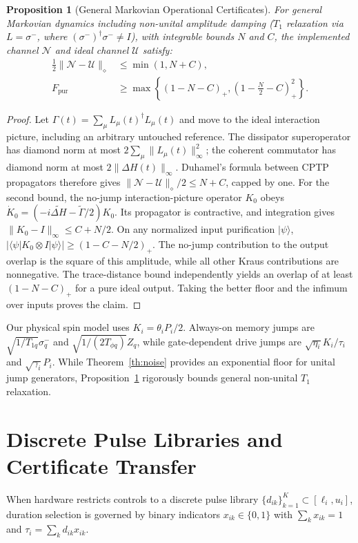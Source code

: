 \documentclass[10pt,letterpaper,journal]{IEEEtran}
\newtheorem{proposition}{Proposition}
\begin{document}
\begin{proposition}[General Markovian Operational Certificates]\label{prop:nonunitary}
For general Markovian dynamics including non-unital amplitude damping ($T_1$ relaxation via $L = \sigma^-$, where $(\sigma^-)^\dagger \sigma^- \ne I$), with integrable bounds $N$ and $C$, the implemented channel $\mathcal{N}$ and ideal channel $\mathcal{U}$ satisfy:
\begin{align}
\tfrac{1}{2}\|\mathcal{N} - \mathcal{U}\|_\diamond &\le \min(1, N + C),\\
F_{\mathrm{pur}} &\ge \max\left\{ (1 - N - C)_+, \left(1 - \tfrac{N}{2} - C\right)_+^2 \right\}.
\end{align}
\end{proposition}
\begin{proof}
Let $\Gamma(t)=\sum_\mu L_\mu(t)^\dagger L_\mu(t)$ and move to the ideal interaction picture, including an arbitrary untouched reference. The dissipator superoperator has diamond norm at most $2\sum_\mu\|L_\mu(t)\|_\infty^2$; the coherent commutator has diamond norm at most $2\|\Delta H(t)\|_\infty$. Duhamel's formula between CPTP propagators therefore gives $\|\mathcal N-\mathcal U\|_\diamond/2\le N+C$, capped by one. For the second bound, the no-jump interaction-picture operator $K_0$ obeys $\dot K_0=(-i\widetilde{\Delta H}-\widetilde\Gamma/2)K_0$. Its propagator is contractive, and integration gives $\|K_0-I\|_\infty\le C+N/2$. On any normalized input purification $|\psi\rangle$, $|\langle\psi|K_0\otimes I|\psi\rangle|\ge(1-C-N/2)_+$. The no-jump contribution to the output overlap is the square of this amplitude, while all other Kraus contributions are nonnegative. The trace-distance bound independently yields an overlap of at least $(1-N-C)_+$ for a pure ideal output. Taking the better floor and the infimum over inputs proves the claim.
\end{proof}

Our physical spin model uses $K_i = \theta_i P_i/2$. Always-on memory jumps are $\sqrt{1/T_{1q}}\sigma^-_q$ and $\sqrt{1/(2T_{\phi q})}Z_q$, while gate-dependent drive jumps are $\sqrt{\eta_i}K_i/\tau_i$ and $\sqrt{\gamma_i}P_i$. While Theorem~\ref{th:noise} provides an exponential floor for unital jump generators, Proposition~\ref{prop:nonunitary} rigorously bounds general non-unital $T_1$ relaxation.

\section{Discrete Pulse Libraries and Certificate Transfer}
When hardware restricts controls to a discrete pulse library $\{d_{ik}\}_{k=1}^K \subset [\ell_i, u_i]$, duration selection is governed by binary indicators $x_{ik} \in \{0, 1\}$ with $\sum_k x_{ik} = 1$ and $\tau_i = \sum_k d_{ik} x_{ik}$.
\end{document}

